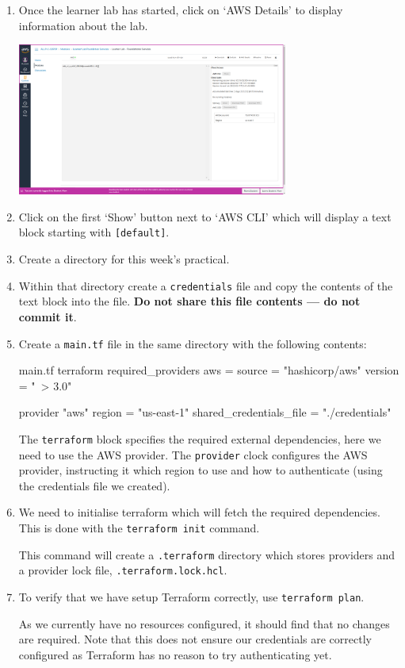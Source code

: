 \documentclass{csse4400}
\begin{document}
\begin{enumerate}
\item Once the learner lab has started, click on `AWS Details' to display information about the lab.

\includegraphics[width=0.7\textwidth]{images/aws-details}

\item Click on the first `Show' button next to `AWS CLI' which will display a text block starting with \texttt{[default]}.
\item Create a directory for this week's practical.
\item Within that directory create a \texttt{credentials} file and copy the contents of the text block into the file.
\textbf{Do not share this file contents --- do not commit it}.
\item Create a \texttt{main.tf} file in the same directory with the following contents:
\begin{code}[language=terraform]{main.tf}
terraform {
    required_providers {
        aws = {
            source  = "hashicorp/aws"
            version = "~> 3.0"
        }
    }
}

provider "aws" {
    region = "us-east-1"
    shared_credentials_file = "./credentials"
}
\end{code}

The \texttt{terraform} block specifies the required external dependencies, here we need to use the AWS provider.
The \texttt{provider} clock configures the AWS provider, instructing it which region to use and how to authenticate (using the credentials file we created).

\item We need to initialise terraform which will fetch the required dependencies. This is done with the \texttt{terraform init} command.

This command will create a \texttt{.terraform} directory which stores providers and a provider lock file, \texttt{.terraform.lock.hcl}.

\item To verify that we have setup Terraform correctly, use \texttt{terraform plan}.

As we currently have no resources configured, it should find that no changes are required.
Note that this does not ensure our credentials are correctly configured as Terraform has no reason to try authenticating yet.

\end{enumerate}
\end{document}
